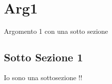 \section{Arg1}

Argomento 1 con una sotto sezione

\subsection{Sotto Sezione 1}

Io sono una sottosezione !! 